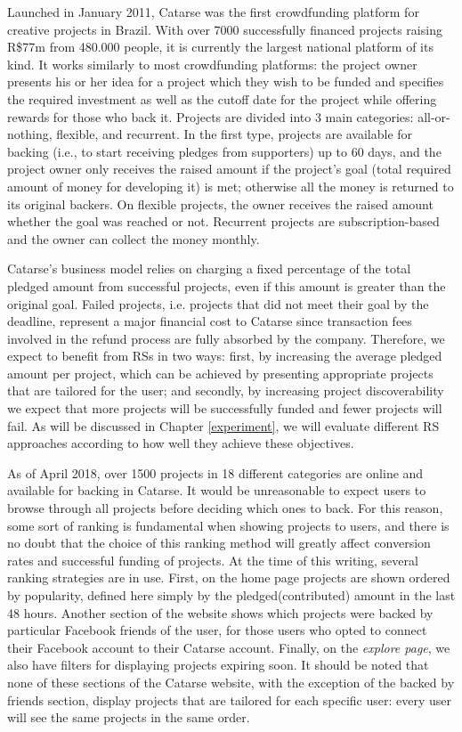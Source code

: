 \documentclass[cic,tc,english]{iiufrgs}
\newcommand{\adriano}[1]{#1}
\begin{document}
Launched in January 2011, Catarse was the first crowdfunding platform for creative projects in Brazil. With over 7000 successfully financed projects raising R\$77m from 480.000 people, it is currently the largest national platform of its kind. It works similarly to most crowdfunding platforms: the project owner presents his or her idea for a project which they wish to be funded and specifies the required investment as well as the cutoff date for the project while offering rewards for those who back it. Projects are divided into 3 main categories: all-or-nothing, flexible, and recurrent. In the first type, projects are available for backing (i.e., to start receiving pledges from supporters) up to 60 days, and the project owner only receives the raised amount if the project's goal (total required amount of money for developing it) is met; otherwise all the money is returned to its original backers. On flexible projects, the owner receives the raised amount whether the goal was reached or not. Recurrent projects are subscription-based and the owner can collect the money monthly. 

Catarse's business model relies on charging a fixed percentage of the total pledged amount from successful projects, even if this amount is greater than the original goal. Failed projects, i.e. projects that did not meet their goal by the deadline, represent a major financial cost to Catarse since transaction fees involved in the refund process are fully absorbed by the company. Therefore, we expect to benefit from RSs in two ways: first, by increasing the average pledged amount per project, which can be achieved by presenting appropriate projects that are tailored for the user; and secondly, by increasing project discoverability we expect that more projects will be successfully funded and fewer projects will fail. \adriano{As will be discussed in Chapter \ref{experiment}, we will evaluate different RS approaches according to how well they achieve these objectives.}

As of April 2018, over 1500 projects in 18 different categories are online and available for backing in Catarse. It would be unreasonable to expect users to browse through all projects before deciding which ones to back. For this reason, some sort of ranking is fundamental when showing projects to users, and there is no doubt that the choice of this ranking method will greatly affect conversion rates and successful funding of projects. At the time of this writing, several ranking strategies are in use. First, on the home page projects are shown ordered by popularity, defined here simply by the pledged(contributed) amount in the last 48 hours. Another section of the website shows which projects were backed by particular Facebook friends of the user, for those users who opted to connect their Facebook account to their Catarse account. Finally, on the \emph{explore page}, we also have filters for displaying projects expiring soon. It should be noted that none of these sections of the Catarse website, with the exception of the backed by friends section, display projects that are tailored for each specific user: every user will see the same projects in the same order.
\end{document}
